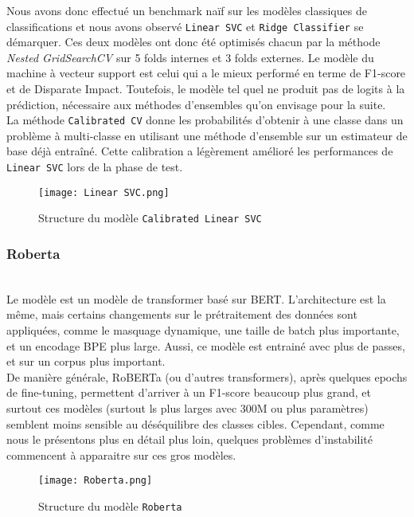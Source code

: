 Nous avons donc effectué un benchmark naïf sur les modèles classiques de classifications et nous avons observé \texttt{Linear SVC} et \texttt{Ridge Classifier} se démarquer. Ces deux modèles ont donc été optimisés chacun par la méthode \textit{Nested GridSearchCV} sur \textsf{5} folds internes et \textsf{3} folds externes. Le modèle du machine à vecteur support est celui qui a le mieux performé en terme de F1-score et de Disparate Impact. Toutefois, le modèle tel quel ne produit pas de logits à la prédiction, nécessaire aux méthodes d'ensembles qu'on envisage pour la suite.\\
La méthode \texttt{Calibrated CV} donne les probabilités d'obtenir à une classe dans un problème à multi-classe en utilisant une méthode d'ensemble sur un estimateur de base déjà entraîné. Cette calibration a légèrement amélioré les performances de \texttt{Linear SVC} lors de la phase de test.

\begin{figure}[!htb]
\centering
\texttt{[image: Linear SVC.png]}
\caption{Structure du modèle \texttt{Calibrated Linear SVC}}
\end{figure}
\newpage

\subsubsection{Roberta}
\hfill\\

Le modèle  est un modèle de transformer basé sur BERT. L'architecture est la même, mais certains changements sur le prétraitement des données sont appliquées, comme le masquage dynamique, une taille de batch plus importante, et un encodage BPE plus large. Aussi, ce modèle est entrainé avec plus de passes, et sur un corpus plus important. \\
De manière générale, RoBERTa (ou d'autres transformers), après quelques epochs de fine-tuning, permettent d'arriver à un F1-score beaucoup plus grand, et surtout ces modèles (surtout ls plus larges avec 300M ou plus paramètres) semblent moins sensible au déséquilibre des classes cibles. Cependant, comme nous le présentons plus en détail plus loin, quelques problèmes d'instabilité commencent à apparaitre sur ces gros modèles.
\begin{figure}[!htb]
\centering
\texttt{[image: Roberta.png]}
\caption{Structure du modèle \texttt{Roberta}}
\end{figure}
\newpage
\hfill\\
